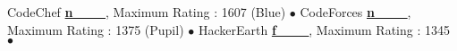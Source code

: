 

\begin{cvhonors}
  \cvhonor
    {\small CodeChef}
    {\small\qquad\quad
     \textbf{\href{https://www.codechef.com/users/n___}{n\_\_\_}}, Maximum Rating : 1607 (Blue)}
    {}
    {$\bullet$}
  \cvhonor
    {\small CodeForces}
    {\small\qquad
     \textbf{ \href{http://www.codeforces.com/profile/n___}{n\_\_\_}}, Maximum Rating : 1375 (Pupil)}
    {}
    {$\bullet$}
  \cvhonor
    {\small HackerEarth}
    {\small\qquad
      \textbf{\href{https://www.hackerearth.com/@f___}{f\_\_\_}}, Maximum Rating : 1345}
    {}
    {$\bullet$}
\end{cvhonors}
